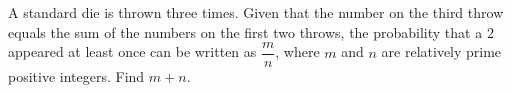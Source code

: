 A standard die is thrown three times. Given that the number on the third throw equals the sum of the numbers on the first two throws, the probability that a $2$ appeared at least once can be written as $\dfrac{m}{n}$, where $m$ and $n$ are relatively prime positive integers. Find $m+n$.

